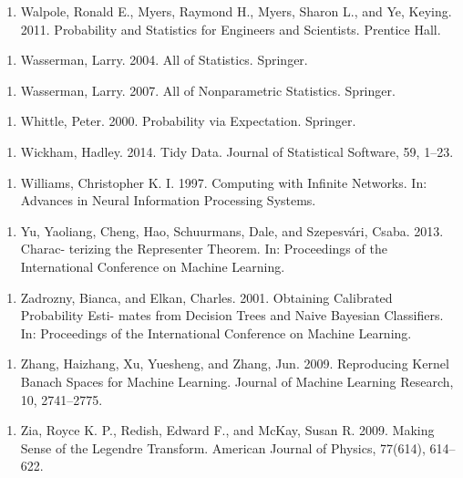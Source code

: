 \begin{enumerate}
\item Walpole, Ronald E., Myers, Raymond H., Myers, Sharon L., and Ye, Keying. 2011. Probability and Statistics for Engineers and Scientists. Prentice Hall.
\end{enumerate}

\begin{enumerate}
\item Wasserman, Larry. 2004. All of Statistics. Springer.
\end{enumerate}

\begin{enumerate}
\item Wasserman, Larry. 2007. All of Nonparametric Statistics. Springer.
\end{enumerate}

\begin{enumerate}
\item Whittle, Peter. 2000. Probability via Expectation. Springer.
\end{enumerate}

\begin{enumerate}
\item Wickham, Hadley. 2014. Tidy Data. Journal of Statistical Software, 59, 1–23.
\end{enumerate}

\begin{enumerate}
\item Williams, Christopher K. I. 1997. Computing with Inﬁnite Networks. In: Advances in Neural Information Processing Systems.
\end{enumerate}

\begin{enumerate}
\item Yu, Yaoliang, Cheng, Hao, Schuurmans, Dale, and Szepesvári, Csaba. 2013. Charac- terizing the Representer Theorem. In: Proceedings of the International Conference on Machine Learning.
\end{enumerate}

\begin{enumerate}
\item Zadrozny, Bianca, and Elkan, Charles. 2001. Obtaining Calibrated Probability Esti- mates from Decision Trees and Naive Bayesian Classiﬁers. In: Proceedings of the International Conference on Machine Learning.
\end{enumerate}

\begin{enumerate}
\item Zhang, Haizhang, Xu, Yuesheng, and Zhang, Jun. 2009. Reproducing Kernel Banach Spaces for Machine Learning. Journal of Machine Learning Research, 10, 2741–2775.
\end{enumerate}

\begin{enumerate}
\item Zia, Royce K. P., Redish, Edward F., and McKay, Susan R. 2009. Making Sense of the Legendre Transform. American Journal of Physics, 77(614), 614–622.
\end{enumerate}
